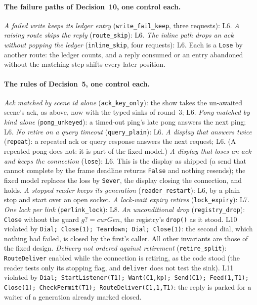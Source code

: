 \documentclass[a4paper,10pt,fleqn]{article}
\begin{document}
\paragraph{The failure paths of Decision~10, one control each.}
\emph{A failed write keeps its ledger entry} (\texttt{write\_fail\_keep}, three
requests): L6.  \emph{A raising route skips the reply} (\texttt{route\_skip}): L6.
\emph{The inline path drops an ack without popping the ledger}
(\texttt{inline\_skip}, four requests): L6.  Each is a \texttt{Lose} by another
route: the ledger counts, and a reply consumed or an entry abandoned without the
matching step shifts every later position.

\paragraph{The rules of Decision~5, one control each.}
\emph{Ack matched by scene id alone}
(\texttt{ack\_key\_only}): the show takes the un-awaited scene's ack, as above,
now with the typed sinks of round~3; L6.
\emph{Pong matched by kind alone} (\texttt{pong\_unkeyed}): a timed-out ping's
late pong answers the next ping; L6.
\emph{No retire on a query timeout} (\texttt{query\_plain}): L6.
\emph{A display that answers twice} (\texttt{repeat}): a repeated ack or query
response answers the next request; L6.  (A repeated pong does not: it is part
of the fixed model.)
\emph{A display that loses an ack and keeps the connection} (\texttt{lose}): L6.
This is the display as shipped (a send that cannot complete by the frame deadline
returns \texttt{False} and nothing resends); the fixed model replaces the loss by
\texttt{Sever}, the display closing the connection, and holds.
\emph{A stopped reader keeps its generation} (\texttt{reader\_restart}): L6,
by a plain stop and start over an open socket.
\emph{A lock-wait expiry retires} (\texttt{lock\_expiry}): L7.
\emph{One lock per link} (\texttt{perlink\_lock}): L8.
\emph{An unconditional drop} (\texttt{registry\_drop}): \texttt{Close} without
the guard $g? = curGen$, the registry's \texttt{drop()} as it stood.  L10
violated by \texttt{Dial; Close(1); Teardown; Dial; Close(1)}: the second dial,
which nothing had failed, is closed by the first's caller.  All other
invariants are those of the fixed design.
\emph{Delivery not ordered against retirement} (\texttt{retire\_split}):
\texttt{RouteDeliver} enabled while the connection is retiring, as the code
stood (the reader tests only its stopping flag, and \texttt{deliver} does not
test the sink).  L11 violated by \texttt{Dial; StartListener(T1); Want(C1,kp);
Send(C1); Feed(1,T1); Close(1); CheckPermit(T1); RouteDeliver(C1,1,T1)}: the
reply is parked for a waiter of a generation already marked closed.
\end{document}
